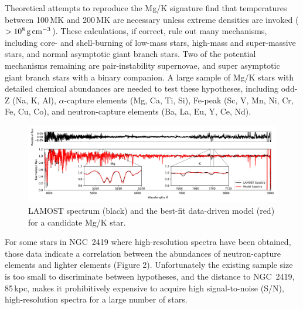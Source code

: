 \documentclass[12pt]{report}
\begin{document}
Theoretical attempts to reproduce the Mg/K signature find that temperatures between 100\,MK and 200\,MK are necessary unless extreme densities are invoked ($>10^8\,{\rm g\,cm}^{-3}$). These calculations, if correct, rule out many mechanisms, including core- and shell-burning of low-mass stars, high-mass and super-massive stars, and normal asymptotic giant branch stars. Two of the potential mechanisms remaining are pair-instability supernovae, and super asymptotic giant branch stars with a binary companion. A large sample of Mg/K stars with detailed chemical abundances are needed to test these hypotheses, including odd-Z (Na, K, Al), $\alpha$-capture elements (Mg, Ca, Ti, Si), Fe-peak (Sc, V, Mn, Ni, Cr, Fe, Cu, Co), and neutron-capture elements (Ba, La, Eu, Y, Ce, Nd).
\setcounter{figure}{0}
\begin{figure}[h!]
	\centering\vspace{-1em}
	\includegraphics[width=\textwidth]{figures/posterchild.png}
	\vspace{-1em}
\caption{\small LAMOST spectrum (black) and the best-fit data-driven model (red) for a candidate Mg/K star.}\vspace{-2em}
	\label{fig:spectra}\end{figure}


For some  stars in NGC~2419 where high-resolution spectra have been obtained, those data indicate a correlation between the abundances of neutron-capture elements and lighter  elements (Figure 2). Unfortunately the existing sample size is too small to discriminate between hypotheses, and the distance to NGC~2419, 85\,kpc, makes it prohibitively expensive to acquire high signal-to-noise (S/N), high-resolution spectra for a large number of stars.
\end{document}
